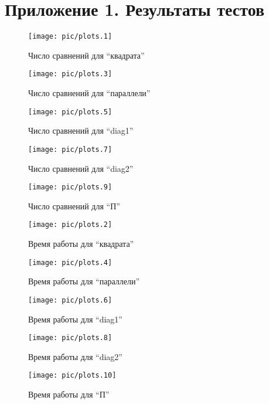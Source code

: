\chapter{Приложение 1. Результаты тестов}
\label{app1}
\newcommand\scalesize{1.0}
\newcommand\figalign\centering

\begin{figure}
\figalign
\texttt{[image: pic/plots.1]}
\caption{Число сравнений для ``квадрата''}\label{plot-square-comp}
\end{figure}
\begin{figure}
\figalign
\texttt{[image: pic/plots.3]}
\caption{Число сравнений для ``параллели''}\label{plot-parallel-comp}
\end{figure}
\begin{figure}
\figalign
\texttt{[image: pic/plots.5]}
\caption{Число сравнений для ``diag1''}\label{plot-diag1-comp}
\end{figure}
\begin{figure}
\figalign
\texttt{[image: pic/plots.7]}
\caption{Число сравнений для ``diag2''}\label{plot-diag2-comp}
\end{figure}
\begin{figure}[b]
\figalign
\texttt{[image: pic/plots.9]}
\caption{Число сравнений для ``П''}\label{plot-parper-comp}
\end{figure}
\begin{figure}
\figalign
\texttt{[image: pic/plots.2]}
\caption{Время работы для ``квадрата''}\label{plot-square-time}
\end{figure}
\begin{figure}
\figalign
\texttt{[image: pic/plots.4]}
\caption{Время работы для ``параллели''}\label{plot-parallel-time}
\end{figure}
\begin{figure}
\figalign
\texttt{[image: pic/plots.6]}
\caption{Время работы для ``diag1''}\label{plot-diag1-time}
\end{figure}
\begin{figure}
\figalign
\texttt{[image: pic/plots.8]}
\caption{Время работы для ``diag2''}\label{plot-diag2-time}
\end{figure}
\begin{figure}[b]
\figalign
\texttt{[image: pic/plots.10]}
\caption{Время работы для ``П''}\label{plot-parper-time}
\end{figure}
